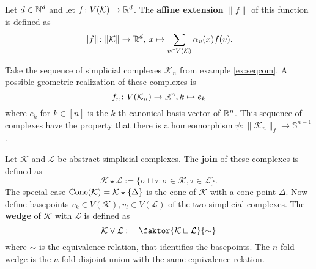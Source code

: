 \begin{defin}
  Let $d \in \mathbb{N}^d$ and let $f\colon V(\mathcal{K}) \to \mathbb{R}^d$. The \textbf{affine extension} $\lVert f \rVert$ of this function is defined as
  \begin{equation*}
    \lVert f \rVert\colon \lVert \mathcal{K} \rVert \to \mathbb{R}^d,\: x \mapsto \sum\limits_{v \in V(\mathcal{K})} \alpha_v(x) f(v).
  \end{equation*}
\end{defin}

\begin{ex}
  Take the sequence of simplicial complexes $\mathcal{K}_n$ from example \ref{ex:seqcom}. A possible geometric realization of these complexes is
  \begin{equation*}
    f_n\colon V(\mathcal{K}_n) \to \mathbb{R}^n, k \mapsto e_k 
  \end{equation*}
  where $e_k$ for $k \in [n]$ is the $k$-th canonical basis vector of $\mathbb{R}^n$. This sequence of complexes have the property that there is a homeomorphism $\psi\colon \lVert \mathcal{K}_n \rVert_f \to \mathbb{S}^{n-1}$.
\end{ex}

\begin{defin}
  Let $\mathcal{K}$ and $\mathcal{L}$ be abstract simplicial complexes. The \textbf{join} of these complexes is defined as
  \begin{equation*}
    \mathcal{K} \star \mathcal{L} := \{\sigma \sqcup \tau\colon \sigma \in \mathcal{K}, \tau \in \mathcal{L} \}.
  \end{equation*}
  The special case ${\rm Cone}(\mathcal{K}) = \mathcal{K} \star \{ \Delta \}$ is the cone of $\mathcal{K}$ with a cone point $\Delta$. 
  Now define basepoints $v_k \in V(\mathcal{K}), v_l \in V(\mathcal{L})$ of the two simplicial complexes. The \textbf{wedge} of $\mathcal{K}$ with $\mathcal{L}$ is defined as
  \begin{equation*}
    \mathcal{K} \lor \mathcal{L} := \: \faktor{\mathcal{K} \sqcup \mathcal{L}}{\sim}
  \end{equation*}
  where $\sim$ is the equivalence relation, that identifies the basepoints.
  The $n$-fold wedge is the $n$-fold disjoint union with the same equivalence relation.
\end{defin}

